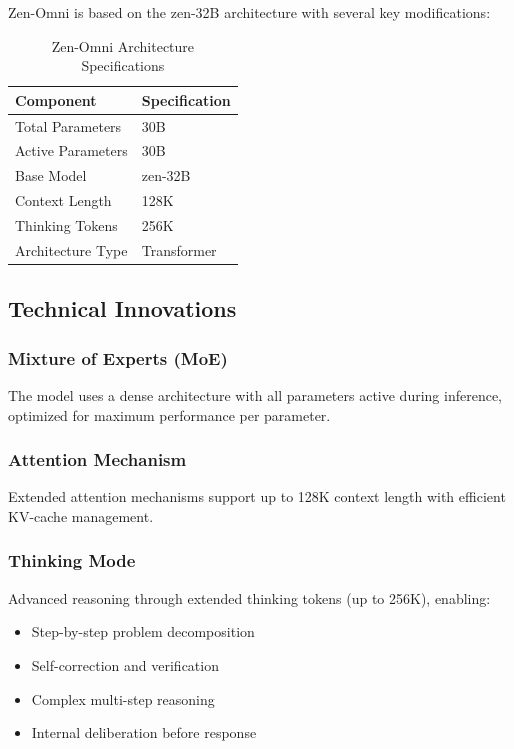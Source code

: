 \documentclass[11pt,a4paper]{article}
\begin{document}
Zen-Omni is based on the zen-32B architecture with several key modifications:

\begin{table}[H]
\centering
\begin{tabular}{ll}
\toprule
\textbf{Component} & \textbf{Specification} \\
\midrule
Total Parameters & 30B \\
Active Parameters & 30B \\
Base Model & zen-32B \\
Context Length & 128K \\
Thinking Tokens & 256K \\

Architecture Type & Transformer \\
\bottomrule
\end{tabular}
\caption{Zen-Omni Architecture Specifications}
\end{table}

\subsection{Technical Innovations}

\subsubsection{Mixture of Experts (MoE)}
The model uses a dense architecture with all parameters active during inference, optimized for maximum performance per parameter.

\subsubsection{Attention Mechanism}
Extended attention mechanisms support up to 128K context length with efficient KV-cache management.

\subsubsection{Thinking Mode}
Advanced reasoning through extended thinking tokens (up to 256K), enabling:
\begin{itemize}
    \item Step-by-step problem decomposition
    \item Self-correction and verification
    \item Complex multi-step reasoning
    \item Internal deliberation before response
\end{itemize}
\end{document}
